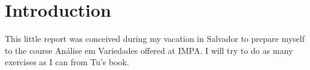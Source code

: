 \chapter*{Introduction}
This little report was conceived during my vacation in Salvador to prepare myself to the course Análise em Variedades
offered at IMPA. I will try to do as many exercises as I can from Tu's book.
